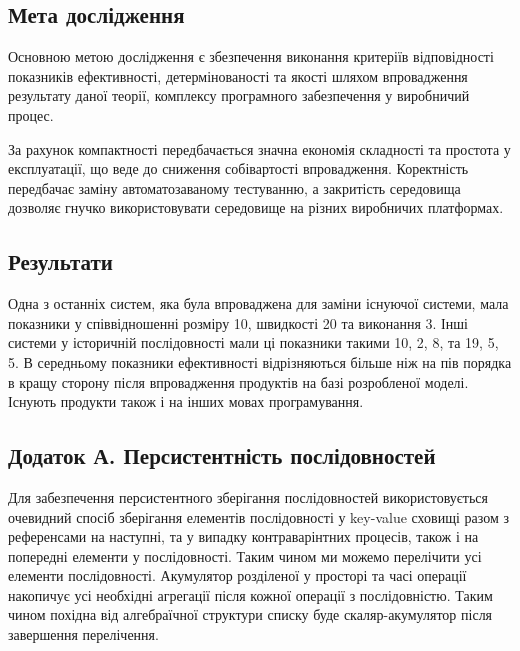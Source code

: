 \documentclass[11pt,oneside]{article}
\begin{document}
\newpage

\subsection{Мета дослідження}
\vspace{0.5cm}
   Основною метою дослідження є збезпечення виконання критеріїв відповідності
   показників ефективності, детермінованості та якості шляхом впровадження
   результату даної теорії, комплексу програмного забезпечення у виробничий процес.

   За рахунок компактності передбачається значна економія складності та простота у експлуатації,
   що веде до сниження собівартості впровадження. Коректність передбачає заміну
   автоматозаваному тестуванню, а закритість середовища дозволяє гнучко використовувати
   середовище на різних виробничих платформах.
   \\

\subsection{Результати}
\vspace{0.5cm}
   Одна з останніх систем, яка була впроваджена для заміни існуючої системи, мала
   показники у співвідношенні розміру 10, швидкості 20 та виконання 3. Інші системи
   у історичній послідовності мали ці показники такими 10, 2, 8, та 19, 5, 5.
   В середньому показники ефективності відрізняються більше ніж на пів порядка
   в кращу сторону після впровадження продуктів на базі розробленої моделі.
   Існують продукти також і на інших мовах програмування.

\newpage
\subsection*{Додаток А. Персистентність послідовностей}

Для забезпечення персистентного зберігання послідовностей використовується
очевидний спосіб зберігання елементів послідовності у key-value сховищі разом
з референсами на наступні, та у випадку контраварінтних процесів, також і на
попередні елементи у послідовності. Таким чином ми можемо перелічити усі
елементи послідовності. Акумулятор розділеної у просторі та часі операції
накопичує усі необхідні агрегації після кожної операції з послідовністю. Таким
чином похідна від алгебраїчної структури списку буде скаляр-акумулятор після
завершення перелічення.
\end{document}
